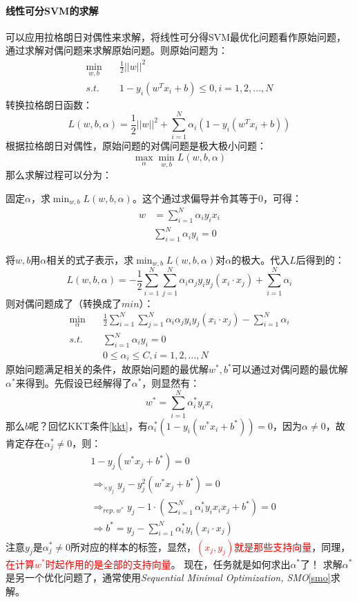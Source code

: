 \paragraph{线性可分SVM的求解}
可以应用拉格朗日对偶性来求解，将线性可分得SVM最优化问题看作原始问题，通过求解对偶问题来求解原始问题。则原始问题为：
\begin{align}
	\mathop{min}_{w, b}&\quad \frac{1}{2}||w||^2 \nonumber \\
	s.t.&\quad 1 - y_i(w^T x_i + b) \leq 0, i = 1, 2, ..., N \nonumber
\end{align}
转换拉格朗日函数：
$$
L(w, b, \alpha) = \frac{1}{ 2}  ||w||^2 + \sum_{i=1}^{N} \alpha_i (1  - y_i(w^T x_i + b))
$$
根据拉格朗日对偶性，原始问题的对偶问题是极大极小问题：
$$
\mathop{max}_{\alpha} \mathop{min}_{w, b} L(w, b, \alpha)
$$
那么求解过程可以分为：
\begin{myenumerate}
	\item 固定$\alpha$，求$\mathop{min}_{w, b} L(w, b, \alpha)$。这个通过求偏导并令其等于0，可得：
	\begin{align}
		w &= \sum_{i=1}^N \alpha_i y_i x_i	\nonumber \\
		&\sum_{i=1}^N \alpha_i y_i = 0 \nonumber
	\end{align}
	
	\item 将$w, b$用$\alpha$相关的式子表示，求$\mathop{min}_{w, b} L(w, b, \alpha)$对$\alpha$的极大。代入$L$后得到的：
	$$
	L(w, b, \alpha) = -\frac{1}{2} \sum_{i=1}^N \sum_{j=1}^{N} \alpha_i \alpha_j y_i y_j (x_i \cdot x_j) + \sum_{i=1}^N \alpha_i
	$$	
	则对偶问题成了（转换成了$min$）：
	\begin{align}
		\mathop{min}_{\alpha}\quad &\frac{1}{2} \sum_{i=1}^N \sum_{j=1}^{N} \alpha_i \alpha_j y_i y_j (x_i \cdot x_j) - \sum_{i=1}^N \alpha_i \nonumber \\
		s.t.\quad &\sum_{i=1}^N \alpha_i y_i = 0 \nonumber \\
				  &0 \leq \alpha_i \leq C, i = 1, 2, ..., N \nonumber
	\end{align}
	原始问题满足相关的条件，故原始问题的最优解$w^*, b^*$可以通过对偶问题的最优解$\alpha^*$来得到。先假设已经解得了$\alpha^*$，则显然有：
	$$
	w^* = \sum_{i=1}^N \alpha_i^* y_i x_i
	$$
	那么$b$呢？回忆KKT条件\ref{kkt}，有$\alpha_i^* (1 - y_i(w^* x_i + b^*)) = 0$，因为$\alpha \neq 0$，故肯定存在$\alpha_j^* \neq 0$，则：
	\begin{align}
		&1 - y_j(w^* x_j + b^*) = 0 \nonumber \\
		&\mathop{\Longrightarrow}_{\times y_j} y_j - y_j^2 (w^* x_j + b^*) = 0 \nonumber \\
		&\mathop{\Longrightarrow}_{rep.\  w^*} y_j - 1 \cdot (\sum_{i=1}^N \alpha_i^* y_i x_i x_j + b^*) = 0 \nonumber \\
		&\Longrightarrow b^* = y_j - \sum_{i=1}^N \alpha_i^* y_i (x_i \cdot x_j) \nonumber 
	\end{align}
	注意$y_j$是$\alpha_j^* \neq 0$所对应的样本的标签，显然，\textcolor{red}{$(x_j, y_j)$就是那些支持向量}，同理，\textcolor{red}{在计算$w^*$时起作用的是全部的支持向量}。
	现在，任务就是如何求出$\alpha^*$了！	求解$\alpha^*$是另一个优化问题了，通常使用\textit{Sequential Minimal Optimization, SMO}\ref{smo}求解。
\end{myenumerate}

